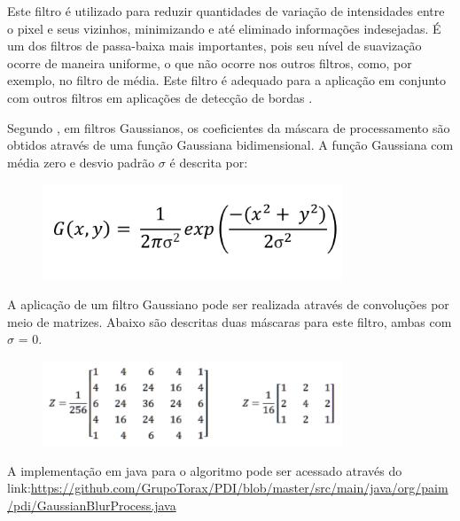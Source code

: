 \documentclass[
	12pt,				%
	oneside,			%
	a4paper,			%
	english,			%
	french,				%
	spanish,			%
	brazil,				%
	]{abntex2}
\begin{document}
Este filtro é utilizado para reduzir quantidades de variação de intensidades entre o pixel e seus vizinhos, minimizando e até eliminado informações indesejadas. É um dos filtros de passa-baixa mais importantes, pois seu nível de suavização ocorre de maneira uniforme, o que não ocorre nos outros filtros, como, por exemplo, no filtro de média. Este filtro é adequado para a aplicação em conjunto com outros filtros em aplicações de detecção de bordas \cite{conciAzevedoLeta:2008}.   

Segundo \citet{pedriniSchwartz:2008}, em filtros Gaussianos, os coeficientes da máscara de processamento são obtidos através de uma função Gaussiana bidimensional. A função Gaussiana com média zero e desvio padrão \(\sigma\) é descrita por:

\begin{figure}[ht]
\centering
\includegraphics[width=0.8\textwidth]{imagens/gauss_formula.png}
\end{figure}

A aplicação de um filtro Gaussiano pode ser realizada através de convoluções por meio de matrizes. Abaixo são descritas duas máscaras para este filtro, ambas com \(\sigma\) = 0.

\begin{figure}[ht]
\centering
\includegraphics[width=0.8\textwidth]{imagens/gauss_mascara.png}
\end{figure}

A implementação em java para o algoritmo pode ser acessado através do link:\url{https://github.com/GrupoTorax/PDI/blob/master/src/main/java/org/paim/pdi/GaussianBlurProcess.java}
\end{document}
